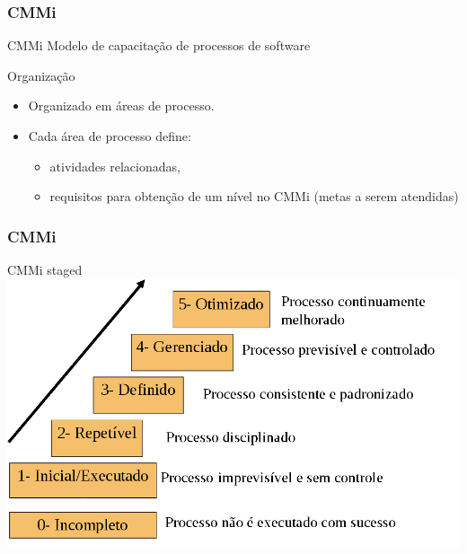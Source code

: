 \begin{frame}[parent={ie:agenda}, hasnext=true, hasprev=false]
	\frametitle{CMMi}

	
	\begin{block:concept}{CMMi}
		Modelo de capacitação de processos de software
	\end{block:concept}
	
	\begin{block:fact}{Organização}
		\begin{itemize}
			\item Organizado em áreas de processo.
			
			\item Cada área de processo define:
			\begin{itemize}
				\item atividades relacionadas,
				\item requisitos para obtenção de um nível no CMMi (metas a serem atendidas)
			\end{itemize}
		\end{itemize}
	\end{block:fact}
	
\end{frame}


\begin{frame}[hasnext=true, hasprev=true]
	\frametitle{CMMi}

	\begin{block:fact}{CMMi staged}
		\centering
		\includegraphics[width=\textwidth]{software-engineering/project-management/process/process-quality/cmmi/cmmi-staged}
	\end{block:fact}
\end{frame}


